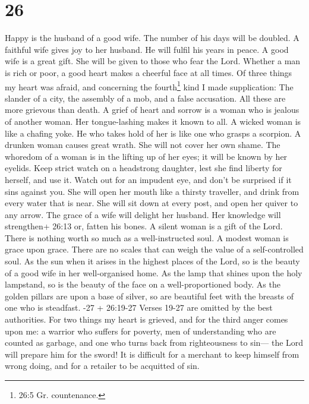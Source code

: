 \hypertarget{section-22}{%
\section{26}\label{section-22}}

 Happy is the husband of a good wife. The number of his days
will be doubled.  A faithful wife gives joy to her husband.
He will fulfil his years in peace.  A good wife is a great
gift. She will be given to those who fear the Lord.  Whether
a man is rich or poor, a good heart makes a cheerful face at all times.
 Of three things my heart was afraid, and concerning the
fourth\footnote{26:5 Gr. countenance.} kind I made supplication: The
slander of a city, the assembly of a mob, and a false accusation. All
these are more grievous than death.  A grief of heart and
sorrow is a woman who is jealous of another woman. Her tongue-lashing
makes it known to all.  A wicked woman is like a chafing
yoke. He who takes hold of her is like one who grasps a scorpion.
 A drunken woman causes great wrath. She will not cover her
own shame.  The whoredom of a woman is in the lifting up of
her eyes; it will be known by her eyelids.  Keep strict
watch on a headstrong daughter, lest she find liberty for herself, and
use it.  Watch out for an impudent eye, and don't be
surprised if it sins against you.  She will open her mouth
like a thirsty traveller, and drink from every water that is near. She
will sit down at every post, and open her quiver to any arrow.
 The grace of a wife will delight her husband. Her
knowledge will strengthen+ 26:13 or, fatten his bones.  A
silent woman is a gift of the Lord. There is nothing worth so much as a
well-instructed soul.  A modest woman is grace upon grace.
There are no scales that can weigh the value of a self-controlled soul.
 As the sun when it arises in the highest places of the
Lord, so is the beauty of a good wife in her well-organised home.
 As the lamp that shines upon the holy lampstand, so is the
beauty of the face on a well-proportioned body.  As the
golden pillars are upon a base of silver, so are beautiful feet with the
breasts of one who is steadfast. -27 + 26:19-27 Verses
19-27 are omitted by the best authorities.  For two things
my heart is grieved, and for the third anger comes upon me: a warrior
who suffers for poverty, men of understanding who are counted as
garbage, and one who turns back from righteousness to sin--- the Lord
will prepare him for the sword!  It is difficult for a
merchant to keep himself from wrong doing, and for a retailer to be
acquitted of sin.

